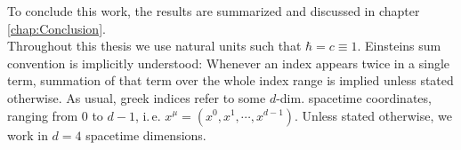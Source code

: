 To conclude this work, the results are summarized and discussed in chapter \ref{chap:Conclusion}. \\
 Throughout this thesis we use natural units such that $\hbar = c  \equiv 1$. Einsteins sum convention is implicitly understood: Whenever an index appears twice in a single term, summation of that term over the whole index range is implied unless stated otherwise. As usual, greek indices refer to some $d$-dim. spacetime coordinates, ranging from $0$ to $d-1$, i.\,e. $x^{\mu} = (x^0, x^1, \cdots, x^{d-1})$. Unless stated otherwise, we work in $d=4$ spacetime dimensions.

